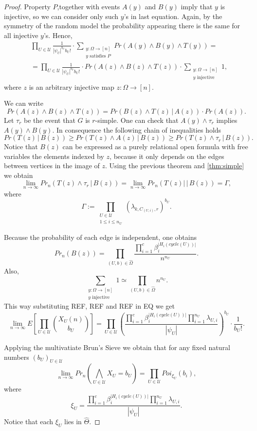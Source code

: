 \documentclass[11pt,notitlepage]{report}
\theoremstyle{definition}
\newcommand{\Ln}{\lim\limits_{n\to \infty}}
\begin{document}
\begin{proof}
	Property $P$,together with events $A(y)$ and $B(y)$ imply that $y$ is
	injective, so we can consider only such $y$'s in last equation. Again, by 
	the symmetry of the random model the probability appearing there is the same
	for all injective $y$'s. Hence,
	\begin{align}
	\nonumber
	&\prod_{U\in \mathcal{U}} 
	\frac{1}{|\psi_U|^{b_U}b_U!} \cdot
	\sum_{\substack{y:\Omega \rightarrow [n]\\y \text{ satisfies }P}}
	Pr(A(y)\wedge B(y)\wedge T(y))= \\ 
	\label{eqn:distributed3}
	& =\prod_{U\in \mathcal{U}} 
	\frac{1}{|\psi_U|^{b_U}b_U!} \cdot Pr(A(z)\wedge B(z)\wedge T(z)) \cdot
	\sum_{\substack{y:\Omega \rightarrow [n]\\y \text{ injective }}}1,
	\end{align}
	where $z$ is an arbitrary injective map $z:\Omega\rightarrow [n]$.\par
	We can write 
	\[Pr(A(z)\wedge B(z)\wedge T(z))=Pr(B(z)\wedge T(z) \, |\, A(z)) \cdot 
	Pr(A(z)).\]
	Let $\tau_r$ be the event that $G$ is $r$-simple. One can check that
	$A(y) \wedge \tau_r$ implies $A(y)\wedge B(y)$. 
	In consequence the following chain of inequalities holds
	\[Pr(T(z)\,|\, B(z))\geq Pr(T(z)\wedge A(z) \,| \, B(z)) \geq
	 Pr(T(z)\wedge \tau_r \,| \, B(z)).\]
	Notice that $B(z)$ can be expressed as a purely relational open formula
	with free variables the elements indexed by $z$, because it only depends on
	the edges between vertices in the image of $z$.
	Using the previous theorem and \cref{thm:simple} we obtain
	\[\Ln Pr_n(T(z)\wedge \tau_r \,| \, B(z))= \Ln Pr_n(T(z)| \,| \, B(z)) = \Gamma, \]
	where
	\[ \Gamma:=\prod_{\substack{U\in \mathcal{U}\\ 1 \leq i\leq n_{U}}}
	(\lambda_{k,C_{(U,i)}, r})^{b_U}.\]
	
	Because the probability of each edge is independent, one obtains 
	\[ Pr_n(B(z))= \prod_{(U,b)\in \widehat{\Omega}} 
	\frac{\prod_{i=1}^c	\beta_i^{|H_i(cycle(U))|}}{n^{n_U}}.  \]
	Also,
	\[\sum_{\substack{y:\Omega \rightarrow [n]\\y \text{ injective }}}1
	\simeq \prod_{(U,b)\in \widehat{\Omega}} n^{n_U}. \]
	This way substituting REF, REF and REF in EQ we get
	\[\Ln E\left[\prod_{U\in \mathcal{U}}
	\binom{X_{U}(n)}{b_{U}}\right]= \prod_{U\in \mathcal{U}}
	\left(\frac{ \prod_{i=1}^c \beta_i^{|H_i(cycle(U))|} \prod_{i=1}^{n_U} \lambda_{U,i}}{|\psi_U|}\right)^{b_U}\cdot \frac{1}{b_{U}!}. \]
	
	Applying the multivatiate Brun's Sieve we obtain that for any fixed  
	natural numbers $(b_U)_{U\in \mathcal{U}}$ 
	\[\Ln Pr_n\left( \bigwedge_{U\in \mathcal{U}} X_U=b_U  \right)=
	\prod_{U\in \mathcal{U}}Poi_{\xi_U}(b_i),
	\]
	where
	\[ \xi_U= \frac{ \prod_{i=1}^c \beta_i^{|H_i(cycle(U))|} \prod_{i=1}^{n_U} \lambda_{U,i}}{|\psi_U|}.\]
	Notice that each $\xi_U$ lies in $\widehat{\Theta}$.
	

\end{proof}
\end{document}
